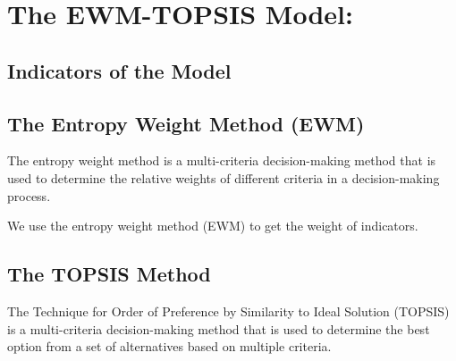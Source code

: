 \MinParskip{}

\section{The EWM-TOPSIS Model: }

\subsection{Indicators of the Model}

\subsection{The Entropy Weight Method (EWM) }
The entropy weight method is a multi-criteria decision-making method that is used to determine the relative weights of different criteria in a decision-making process.

We use the entropy weight method (EWM) to get the weight of indicators.


\subsection{The TOPSIS Method}
The Technique for Order of Preference by Similarity to Ideal Solution (TOPSIS) is a multi-criteria decision-making method that is used to determine the best option from a set of alternatives based on multiple criteria. 


